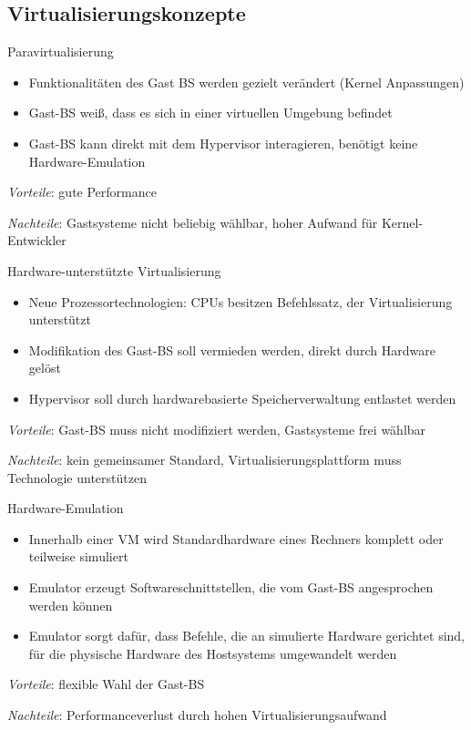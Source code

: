 \documentclass[german]{spicker}
\begin{document}
\subsection{Virtualisierungskonzepte}

\begin{defi}{Paravirtualisierung}
    \begin{itemize}
        \item Funktionalitäten des Gast BS werden gezielt verändert (Kernel Anpassungen)
        \item Gast-BS \glqq weiß\grqq, dass es sich in einer virtuellen Umgebung befindet
        \item Gast-BS kann direkt mit dem Hypervisor interagieren, benötigt keine Hardware-Emulation
    \end{itemize}

    \emph{Vorteile}: gute Performance

    \emph{Nachteile}: Gastsysteme nicht beliebig wählbar, hoher Aufwand für Kernel-Entwickler
\end{defi}

\begin{defi}{Hardware-unterstützte Virtualisierung}
    \begin{itemize}
        \item Neue Prozessortechnologien: CPUs besitzen Befehlssatz, der Virtualisierung unterstützt
        \item Modifikation des Gast-BS soll vermieden werden, direkt durch Hardware gelöst
        \item Hypervisor soll durch hardwarebasierte Speicherverwaltung entlastet werden
    \end{itemize}

    \emph{Vorteile}: Gast-BS muss nicht modifiziert werden, Gastsysteme frei wählbar

    \emph{Nachteile}: kein gemeinsamer Standard, Virtualisierungsplattform muss Technologie unterstützen
\end{defi}

\begin{defi}{Hardware-Emulation}
    \begin{itemize}
        \item Innerhalb einer VM wird Standardhardware eines Rechners komplett oder teilweise simuliert
        \item Emulator erzeugt Softwareschnittstellen, die vom Gast-BS angesprochen werden können
        \item Emulator sorgt dafür, dass Befehle, die an simulierte Hardware gerichtet sind, für die physische Hardware des Hostsystems umgewandelt werden
    \end{itemize}

    \emph{Vorteile}: flexible Wahl der Gast-BS

    \emph{Nachteile}: Performanceverlust durch hohen Virtualisierungsaufwand
\end{defi}
\end{document}
